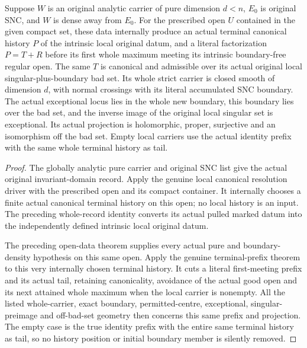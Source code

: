\begin{theorem}
\label{hir:original-local-pure-boundary-canonical-prefix-producer}
Suppose $W$ is an original analytic carrier of pure dimension $d<n$,
$E_0$ is original SNC, and $W$ is dense away from $E_0$. For the
prescribed open $U$ contained in the given compact set, these data
internally produce an actual terminal canonical history $P$ of the
intrinsic local original datum, and a literal factorization
$P=T\mathbin{+}R$ before its first whole maximum meeting its intrinsic
boundary-free regular open. The same $T$ is canonical and admissible
over its actual original local singular-plus-boundary bad set.
Its whole strict carrier is closed smooth of dimension $d$, with
normal crossings with its literal accumulated SNC boundary. The
actual exceptional locus lies in the whole new boundary, this
boundary lies over the bad set, and the inverse image of the original
local singular set is exceptional. Its actual projection is
holomorphic, proper, surjective and an isomorphism off the bad set.
Empty local carriers use the actual identity prefix with the same
whole terminal history as tail.
\leanok
\end{theorem}
\begin{proof}
The globally analytic pure carrier and original SNC list give the
actual original invariant-domain record. Apply the genuine local
canonical resolution driver with the prescribed open and its compact
container. It internally chooses a finite actual canonical terminal
history on this open; no local history is an input. The preceding
whole-record identity converts its actual pulled marked datum into
the independently defined intrinsic local original datum.

The preceding open-data theorem supplies every actual pure and
boundary-density hypothesis on this same open. Apply the genuine
terminal-prefix theorem to this very internally chosen terminal
history. It cuts a literal first-meeting prefix and its actual tail,
retaining canonicality, avoidance of the actual good open and its
next attained whole maximum when the local carrier is nonempty.
All the listed whole-carrier, exact boundary, permitted-centre,
exceptional, singular-preimage and off-bad-set geometry then concerns
this same prefix and projection. The empty case is the true identity
prefix with the entire same terminal history as tail, so no history
position or initial boundary member is silently removed.
\end{proof}

